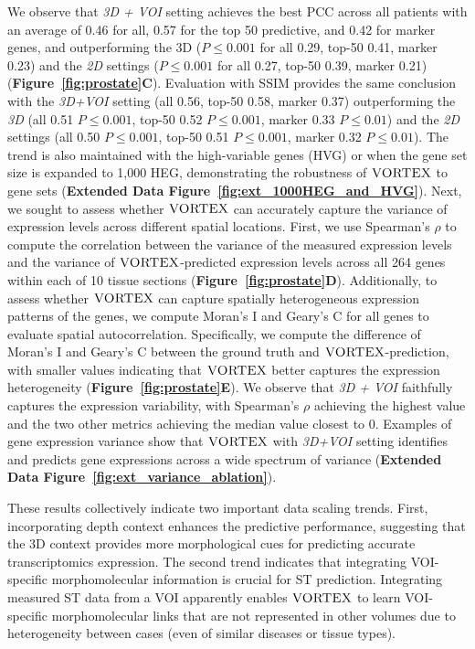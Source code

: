 We observe that \textit{3D + VOI} setting achieves the best PCC across all patients with an average of 0.46 for all, 0.57 for the top 50 predictive, and 0.42 for marker genes, and outperforming the 3D (\textit{$P\leq 0.001$} for all 0.29, top-50 0.41, marker 0.23) and the \textit{2D} settings (\textit{$P\leq 0.001$} for all 0.27, top-50 0.39, marker 0.21) (\textbf{Figure~\ref{fig:prostate}C}). Evaluation with SSIM provides the same conclusion with the \textit{3D+VOI} setting (all 0.56, top-50 0.58, marker 0.37) outperforming the \textit{3D} (all 0.51 \textit{$P\leq 0.001$}, top-50 0.52 \textit{$P\leq 0.001$}, marker 0.33 \textit{$P\leq 0.01$}) and the \textit{2D} settings (all 0.50 \textit{$P\leq 0.001$}, top-50 0.51 \textit{$P\leq 0.001$}, marker 0.32 \textit{$P\leq 0.01$}).
The trend is also maintained with the high-variable genes (HVG) or when the gene set size is expanded to 1,000 HEG, demonstrating the robustness of $\textsc{VORTEX}$ to gene sets (\textbf{Extended Data Figure~\ref{fig:ext_1000HEG_and_HVG}}). Next, we sought to assess whether $\textsc{VORTEX}$ can accurately capture the variance of expression levels across different spatial locations. First, we use Spearman's $\rho$ to compute the correlation between the variance of the measured expression levels and the variance of $\textsc{VORTEX}$-predicted expression levels across all 264 genes within each of 10 tissue sections (\textbf{Figure~\ref{fig:prostate}D}). 
Additionally, to assess whether $\textsc{VORTEX}$ can capture spatially heterogeneous expression patterns of the genes, we compute Moran's I\cite{moran1950notes} and Geary's C\cite{geary1954contiguity} for all genes to evaluate spatial autocorrelation. Specifically, we compute the difference of Moran's I and Geary's C between the ground truth and $\textsc{VORTEX}$-prediction, with smaller values indicating that $\textsc{VORTEX}$ better captures the expression heterogeneity (\textbf{Figure~\ref{fig:prostate}E}). We observe that \textit{3D + VOI} faithfully captures the expression variability, with Spearman's $\rho$ achieving the highest value and the two other metrics achieving the median value closest to 0. Examples of gene expression variance show that $\textsc{VORTEX}$ with \textit{3D+VOI} setting identifies and predicts gene expressions across a wide spectrum of variance (\textbf{Extended Data Figure~\ref{fig:ext_variance_ablation}}).

These results collectively indicate two important data scaling trends. 
First, incorporating depth context enhances the predictive performance, suggesting that the 3D context provides more morphological cues for predicting accurate transcriptomics expression. The second trend indicates that integrating VOI-specific morphomolecular information is crucial for ST prediction. Integrating measured ST data from a VOI apparently enables $\textsc{VORTEX}$ to learn VOI-specific morphomolecular links that are not represented in other volumes due to heterogeneity between cases (even of similar diseases or tissue types).

